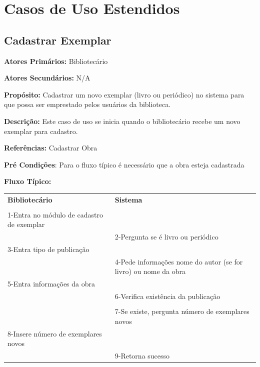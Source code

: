 \documentclass[
	12pt,				%
	openright,			%
	oneside,			%
	a4paper,			%
	english,			%
	brazil				%
	]{abntex2}
\begin{document}
\section{Casos de Uso Estendidos}

\subsection{Cadastrar Exemplar}

\textbf{Atores Primários:}	Bibliotecário

\textbf{Atores Secundários:}	N/A

\textbf{Propósito:}	Cadastrar um novo exemplar (livro ou periódico) no sistema para que possa ser emprestado pelos usuários da biblioteca.

\textbf{Descrição:}	Este caso de uso se inicia quando o bibliotecário recebe um novo exemplar para cadastro.

\textbf{Referências:}	Cadastrar Obra

\textbf{Pré Condições}:	Para o fluxo típico é necessário que a obra esteja cadastrada

\textbf{Fluxo Típico:}

\begin{table}[H]
\ABNTEXfontereduzida
\begin{center}
\begin{tabular}{p{5.5cm} p{5.5cm}}
    \textbf{Bibliotecário} & \textbf{Sistema}\\
     & \\
     1-Entra no módulo de cadastro de exemplar & \\
      & 2-Pergunta se é livro ou periódico \\
     3-Entra tipo de publicação & \\
       & 4-Pede informações nome do autor (se for livro) ou nome da obra\\
     5-Entra informações da obra & \\
       & 6-Verifica existência da publicação\\       
       & \\
       & 7-Se existe, pergunta número de exemplares novos\\
     8-Insere número de exemplares novos & \\             
       & 9-Retorna sucesso\\  
\end{tabular}
\end{center}
\end{table}
                
\end{document}
